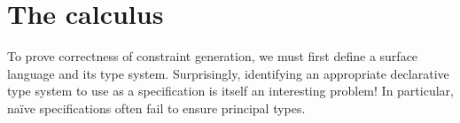 \documentclass[acmsmall,screen,nonacm,review]{acmart}
\begin{document}
\section{The \OML calculus}
\label{sec:language}



To prove correctness of constraint generation, we must first define a surface
language and its type system. Surprisingly, identifying an appropriate
declarative type system to use as a specification is itself an interesting
problem! In particular, na\"ive specifications often fail to ensure principal types.

\end{document}
